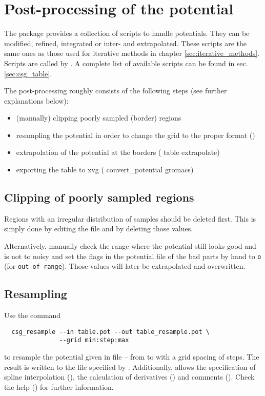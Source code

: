 \section{Post-processing of the potential}
\label{sec:post_processing}
The \votca package provides a collection of scripts to handle potentials. They can be modified, refined, integrated or inter- and extrapolated. These scripts are the same ones as those used for iterative methods in chapter \ref{sec:iterative_methods}. Scripts are called by . A complete list of available scripts can be found in sec. \ref{sec:csg_table}.

The post-processing roughly consists of the following steps (see further explanations below):
\begin{itemize}
  \item (manually) clipping poorly sampled (border) regions
  \item resampling the potential in order to change the grid to the proper format ()
  \item extrapolation of the potential at the borders ( table extrapolate)
  \item exporting the table to xvg ( convert\_potential gromacs)
\end{itemize}

\subsection*{Clipping of poorly sampled regions}
Regions with an irregular distribution of samples should be deleted first. This is simply done by editing the  file and by deleting those values.

Alternatively, manually check the range where the potential still looks good and is not to noisy and set the flags in the potential file of the bad parts by hand to \texttt{o} (for \texttt{out of range}). Those values will later be extrapolated and overwritten.

\subsection*{Resampling}
Use the command
\begin{verbatim}
  csg_resample --in table.pot --out table_resample.pot \
               --grid min:step:max
\end{verbatim}
to resample the potential given in file -- from  to  with a grid spacing of  steps. The result is written to the file specified by . Additionally,  allows the specification of spline interpolation (), the calculation of derivatives () and comments (). Check the help () for further information.

